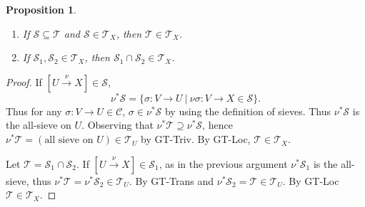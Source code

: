 \documentclass[8pt]{article}
\numberwithin{equation}{section}
\newtheorem{proposition}{Proposition}[subsection]
\newtheorem{remark}{Remark}[subsection]
\newcommand{\sep}[0]{\:|\:}
\newcommand{\sC}[0]{\mathscr{C}}
\newcommand{\sS}[0]{\mathscr{S}}
\begin{document}
\begin{proposition}$\:$
    \label{fact_8_1} 
    \begin{enumerate}
        \item If $\sS\subseteq\mathscr{T}$ and $\sS\in\mathcal{T}_X$, then $\mathscr{T}\in\mathcal{T}_X$. 
        \item If $\sS_1,\sS_2\in\mathcal{T}_X$, then $\sS_1\cap \sS_2\in\mathcal{T}_X$.
    \end{enumerate}
\end{proposition}
\begin{proof}
    If $[U\stackrel{\nu}{\to}X]\in\sS$,
    \begin{equation*}
    \nu^*\sS = \{\sigma:V\to U\sep \nu\sigma: V\to X\in\sS\}.
    \end{equation*}
    Thus for any $\sigma:V\to U\in\sC$, $\sigma\in\nu^*\sS$ by using the definition of sieves. Thus $\nu^*\sS$ is the all-sieve on $U$. Observing that $\nu^*\mathscr{T}\supseteq \nu^*\sS$, hence $\nu^*\mathscr{T}=(\text{all sieve on $U$})\in\mathcal{T}_U$ by GT-Triv.
    By GT-Loc, $\mathscr{T}\in\mathcal{T}_X$. 
    \par Let $\mathscr{T}=\sS_1\cap \sS_2$. If $[U\stackrel{\nu}{\to}X]\in\sS_1$, as in the previous argument $\nu^*\mathscr{S}_1$ is the all-sieve, thus $\nu^*\mathscr{T}=\nu^*\sS_2\in\mathcal{T}_U$. By GT-Trans and $\nu^*\sS_2=\mathscr{T}\in\mathcal{T}_U$. By GT-Loc $\mathscr{T}\in\mathcal{T}_X$.
\end{proof}
\end{document}
